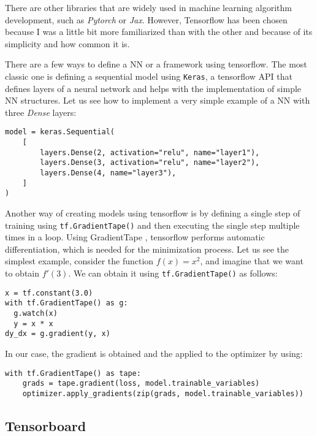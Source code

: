 There are other libraries that are widely used in machine learning algorithm development, such as \emph{Pytorch} or \emph{Jax}. However, Tensorflow has been chosen because I was a little bit more familiarized than with the other and because of its simplicity and how common it is. 

There are a few ways to define a NN or a framework using tensorflow. The most classic one is defining a sequential model using \lstinline{Keras}, a tensorflow API that defines layers of a neural network and helps with the implementation of simple NN structures. Let us see how to implement a very simple example of a NN with three \emph{Dense} layers: 

\begin{verbatim}
model = keras.Sequential(
    [
        layers.Dense(2, activation="relu", name="layer1"),
        layers.Dense(3, activation="relu", name="layer2"),
        layers.Dense(4, name="layer3"),
    ]
)
\end{verbatim}

Another way of creating models using tensorflow is by defining a single step of training using \lstinline{tf.GradientTape()} and then executing the single step multiple times in a loop. Using GradientTape , tensorflow performs automatic differentiation, which is needed for the minimization process. Let us see the simplest example, consider the function $f(x) = x^2$, and imagine that we want to obtain $f'(3)$. We can obtain it using \lstinline{tf.GradientTape()} as follows:

\begin{verbatim}
x = tf.constant(3.0)
with tf.GradientTape() as g:
  g.watch(x)
  y = x * x
dy_dx = g.gradient(y, x)
\end{verbatim}

In our case, the gradient is obtained and the applied to the optimizer by using:

\begin{verbatim}
with tf.GradientTape() as tape:
    grads = tape.gradient(loss, model.trainable_variables)
    optimizer.apply_gradients(zip(grads, model.trainable_variables))
\end{verbatim}


\subsection{Tensorboard}

